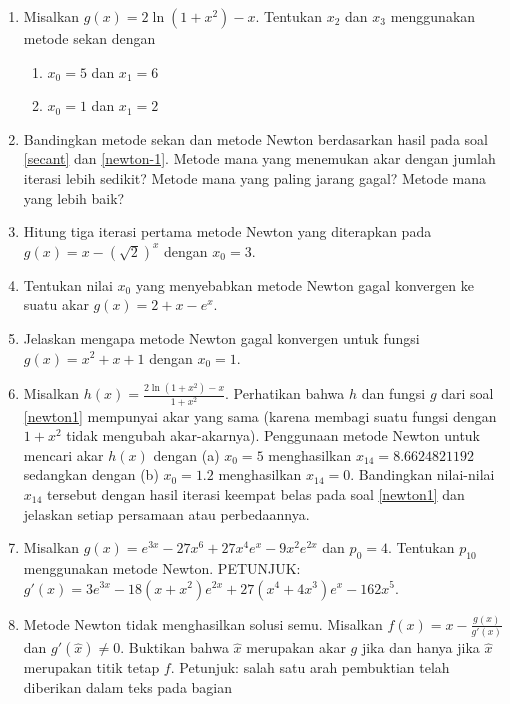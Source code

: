 \begin{enumerate}
\begin{enumerate}
\item $x_{0}=5$
\item $x_{0}=1.2$  \hasananswer 
\end{enumerate}
\item Misalkan $g(x)=2\ln(1+x^{2})-x$. Tentukan $x_{2}$ dan $x_{3}$ menggunakan
metode sekan dengan

\begin{enumerate}
\item \label{exc:newton-3}$x_{0}=5$ dan $x_{1}=6$ \hasasolution 
\item $x_{0}=1$ dan $x_{1}=2$
\end{enumerate}
\item Bandingkan metode sekan dan metode Newton berdasarkan hasil pada soal
\ref{secant} dan \ref{newton-1}. Metode mana yang menemukan akar
dengan jumlah iterasi lebih sedikit? Metode mana yang paling jarang
gagal? Metode mana yang lebih baik?
\item Hitung tiga iterasi pertama metode Newton yang diterapkan pada $g(x)=x-(\sqrt{2})^{x}$
dengan $x_{0}=3$.
\item Tentukan nilai $x_{0}$ yang menyebabkan metode Newton gagal konvergen
ke suatu akar $g(x)=2+x-e^{x}$.
\item Jelaskan mengapa metode Newton gagal konvergen untuk fungsi $g(x)=x^{2}+x+1$
dengan $x_{0}=1$.
\item \label{exc:newton-4}Misalkan $h(x)={\displaystyle \frac{2\ln(1+x^{2})-x}{1+x^{2}}}.$
Perhatikan bahwa $h$ dan fungsi $g$ dari soal \ref{newton1} mempunyai
akar yang sama (karena membagi suatu fungsi dengan $1+x^{2}$ tidak
mengubah akar-akarnya). Penggunaan metode Newton untuk mencari akar
$h(x)$ dengan (a) $x_{0}=5$ menghasilkan $x_{14}=8.6624821192$
sedangkan dengan (b) $x_{0}=1.2$ menghasilkan $x_{14}=0$. Bandingkan
nilai-nilai $x_{14}$ tersebut dengan hasil iterasi keempat belas
pada soal \ref{newton1} dan jelaskan setiap persamaan atau perbedaannya. \hasananswer 
\item \label{exc:newton-5}Misalkan $g(x)=e^{3x}-27x^{6}+27x^{4}e^{x}-9x^{2}e^{2x}$
dan $p_{0}=4$. Tentukan $p_{10}$ menggunakan metode Newton. PETUNJUK:
$g'(x)=3e^{3x}-18(x+x^{2})e^{2x}+27(x^{4}+4x^{3})e^{x}-162x^{5}$.
 \hasananswer 
\item Metode Newton tidak menghasilkan solusi semu. Misalkan $f(x)=x-\frac{g(x)}{g'(x)}$
dan $g'(\hat{x})\neq0$. Buktikan bahwa $\hat{x}$ merupakan akar
$g$ jika dan hanya jika $\hat{x}$ merupakan titik tetap $f$. Petunjuk:
salah satu arah pembuktian telah diberikan dalam teks pada bagian

\end{enumerate}
